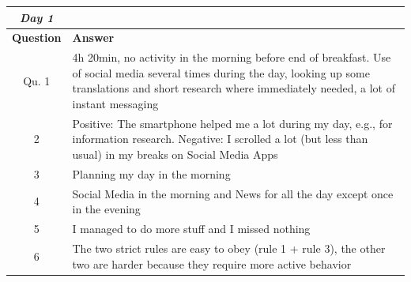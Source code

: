 \documentclass[11pt,a4paper]{article}
\begin{document}
\begin{table}[H]
	\centering
	
\begin{tabularx}{\textwidth}{cb}
\textbf{\textit{Day 1}} &    \\ \midrule[2pt]	
	\textbf{Question}&\textbf{Answer}\\ \toprule[1.3pt]	
	Qu. 1 & 4h 20min, no activity in the morning before end of breakfast. Use of social media several times during the day, looking up some translations and short research where immediately needed, a lot of instant messaging  \\ \midrule[0.5pt]
	2 & Positive: The smartphone helped me a lot during my day, e.g., for information research. Negative: I scrolled a lot (but less than usual) in my breaks on Social Media Apps \\ \midrule[0.5pt]
	3 & Planning my day in the morning\\ \midrule[0.5pt]
	4 & Social Media in the morning and News for all the day except once in the evening \\ \midrule[0.5pt]
	5 & I managed to do more stuff and I missed nothing \\ \midrule[0.5pt]
	6 & The two strict rules are easy to obey (rule 1 + rule 3), the other two are harder because they require more active behavior  \\ \bottomrule[1.3pt]
\end{tabularx}

\end{table}
\end{document}
